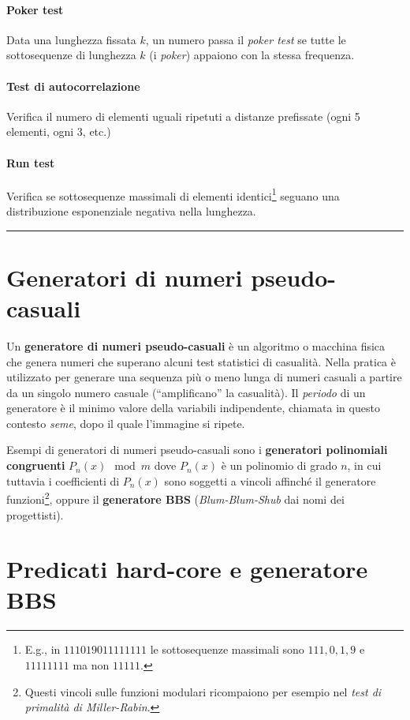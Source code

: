 \documentclass{article}
\begin{document}
\paragraph{Poker test}
Data una lunghezza fissata $k$, un numero passa il \emph{poker test} se tutte le sottosequenze di lunghezza $k$ (i \emph{poker}) appaiono con la stessa frequenza.
\paragraph{Test di autocorrelazione}
Verifica il numero di elementi uguali ripetuti a distanze prefissate (ogni 5 elementi, ogni 3, etc.)
\paragraph{Run test}
Verifica se sottosequenze massimali di elementi identici\footnote{E.g., in $111019011111111$ le sottosequenze massimali sono $111,0,1,9$ e $11111111$ ma non $11111$.} seguano una distribuzione esponenziale negativa nella lunghezza.
\hrule

\section{Generatori di numeri pseudo-casuali}
Un \textbf{generatore di numeri pseudo-casuali} è un algoritmo o macchina fisica che genera numeri che superano alcuni test statistici di casualità. Nella pratica è utilizzato per generare una sequenza più o meno lunga di numeri casuali a partire da un singolo numero casuale (``amplificano'' la casualità). Il \emph{periodo} di un generatore è il minimo valore della variabili indipendente, chiamata in questo contesto \emph{seme}, dopo il quale l'immagine si ripete. 

Esempi di generatori di numeri pseudo-casuali sono i \textbf{generatori polinomiali congruenti} $P_n(x)\mod m$ dove $P_n(x)$
è un polinomio di grado $n$,
in cui tuttavia i coefficienti di $P_n(x)$
sono soggetti a vincoli affinché il generatore funzioni\footnote{Questi vincoli sulle funzioni modulari ricompaiono per esempio nel \emph{test di primalità di Miller-Rabin}.}, oppure il \textbf{generatore BBS} 
(\emph{Blum-Blum-Shub} dai nomi dei progettisti).

\section{Predicati hard-core e generatore BBS}
\end{document}
